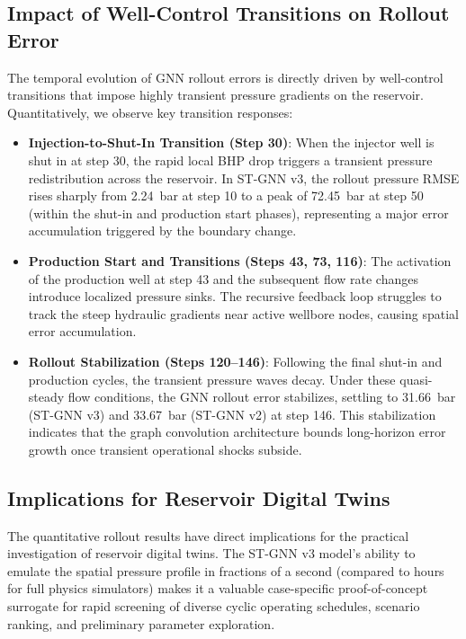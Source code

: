 \documentclass[10pt,twocolumn]{article}
\begin{document}
\subsection{Impact of Well-Control Transitions on Rollout Error}
The temporal evolution of GNN rollout errors is directly driven by well-control transitions that impose highly transient pressure gradients on the reservoir. Quantitatively, we observe key transition responses:
\begin{itemize}
    \item \textbf{Injection-to-Shut-In Transition (Step 30)}: When the injector well is shut in at step 30, the rapid local BHP drop triggers a transient pressure redistribution across the reservoir. In ST-GNN v3, the rollout pressure RMSE rises sharply from 2.24~bar at step 10 to a peak of 72.45~bar at step 50 (within the shut-in and production start phases), representing a major error accumulation triggered by the boundary change.
    \item \textbf{Production Start and Transitions (Steps 43, 73, 116)}: The activation of the production well at step 43 and the subsequent flow rate changes introduce localized pressure sinks. The recursive feedback loop struggles to track the steep hydraulic gradients near active wellbore nodes, causing spatial error accumulation.
    \item \textbf{Rollout Stabilization (Steps 120--146)}: Following the final shut-in and production cycles, the transient pressure waves decay. Under these quasi-steady flow conditions, the GNN rollout error stabilizes, settling to 31.66~bar (ST-GNN v3) and 33.67~bar (ST-GNN v2) at step 146. This stabilization indicates that the graph convolution architecture bounds long-horizon error growth once transient operational shocks subside.
\end{itemize}

\subsection{Implications for Reservoir Digital Twins}
The quantitative rollout results have direct implications for the practical investigation of reservoir digital twins. The ST-GNN v3 model's ability to emulate the spatial pressure profile in fractions of a second (compared to hours for full physics simulators) makes it a valuable case-specific proof-of-concept surrogate for rapid screening of diverse cyclic operating schedules, scenario ranking, and preliminary parameter exploration.
\end{document}
